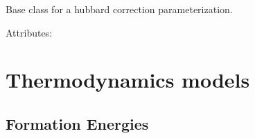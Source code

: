 \documentclass[letterpaper,10pt,english]{sphinxmanual}
\begin{document}

\begin{fulllineitems}
\label{models:qmpy.Hubbard}
Base class for a hubbard correction parameterization.
\begin{description}
\item[{Attributes:}] \leavevmode
{}

\end{description}

\end{fulllineitems}



\section{Thermodynamics models}
\label{models:thermodynamics-models}

\subsection{Formation Energies}
\label{models:formation-energies}
\end{document}
